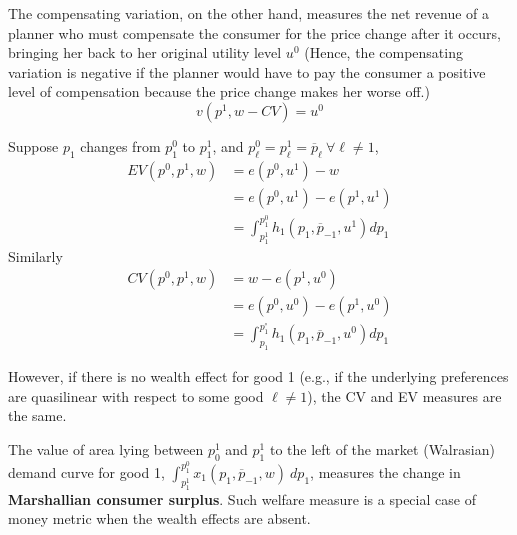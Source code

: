 \documentclass{report}
\begin{document}
 			\begin{remark}[interpretation of CV]
 				The compensating variation, on the other hand, measures the net revenue of a planner who must compensate the consumer for the price change after it occurs, bringing her back to her original utility level $u^0$ (Hence, the compensating variation is negative if the planner would have to pay the consumer a positive level of compensation because the price change makes her worse off.)
 				\begin{equation}
 					v\left(p^{1}, w-C V\right)=u^{0}
 				\end{equation}
 			\end{remark}
 			
 			\begin{proposition}
 				Suppose $p_1$ changes from $p_1^0$ to $p_1^1$, and $p^0_\ell = p^1_\ell = \overline{p}_\ell\ \forall \ell \neq 1$,
 				\begin{align}
 					EV\left(p^{0}, p^{1}, w\right) &=e\left(p^{0}, u^{1}\right)-w \\ 
 					&=e\left(p^{0}, u^{1}\right)-e\left(p^{1}, u^{1}\right) \\
 					&=\int_{p_{1}^{1}}^{p_{1}^{0}} h_{1}\left(p_{1}, \overline{p}_{-1}, u^{1}\right) d p_{1}
 				\end{align}
 				Similarly
 				\begin{align}
	 				CV\left(p^{0}, p^{1}, w\right) &= w - e(p^1, u^0) \\
	 				&= e(p^0, u^0) - e(p^1, u^0) \\
	 				&=\int_{p_{1}}^{p_{1}^{\circ}} h_{1}\left(p_{1}, \overline{p}_{-1}, u^{0}\right) d p_{1}
 				\end{align}
 			\end{proposition}
 			
 			\begin{remark}
 				However, if there is no wealth effect for good 1 (e.g., if the underlying preferences are quasilinear with respect to some good $\ell \neq 1$), the CV and EV measures are the same.
 			\end{remark}
 			
 			\begin{definition}
 				The value of area lying between $p_0^1$ and $p_1^1$ to the left of the market (Walrasian) demand curve for good 1, $\int_{p_1^1}^{p_1^0} x_1(p_1, \overline{p}_{-1}, w)\ dp_1$, measures the change in \textbf{Marshallian consumer surplus}. Such welfare measure is a special case of money metric when the wealth effects are absent.
 			\end{definition}
 			
\end{document}
